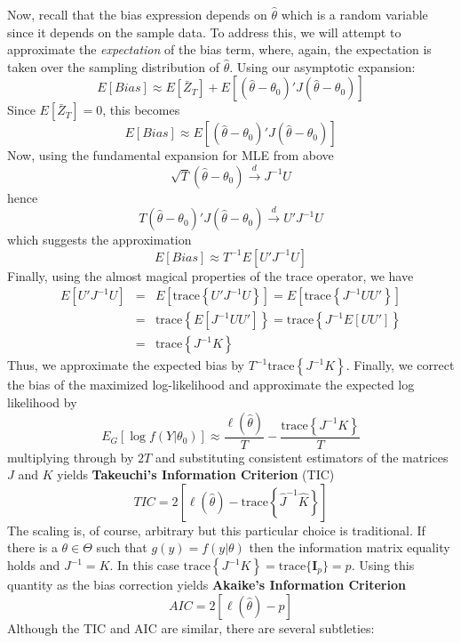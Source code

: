 Now, recall that the bias expression depends on $\widehat{\theta}$ which is a random variable since it depends on the sample data. To address this, we will attempt to approximate the \emph{expectation} of the bias term, where, again, the expectation is taken over the sampling distribution of $\widehat{\theta}$. Using our asymptotic expansion:
$$E[Bias] \approx E[\bar{Z}_T] + E[(\widehat{\theta} - \theta_0)' J (\widehat{\theta} - \theta_0)]$$
Since $E[\bar{Z}_T] = 0$, this becomes
$$E[Bias] \approx E[(\widehat{\theta} - \theta_0)' J (\widehat{\theta} - \theta_0)]$$
Now, using the fundamental expansion for MLE from above
$$\sqrt{T}\left(\widehat{\theta} - \theta_0 \right) \overset{d}{\rightarrow} J^{-1}U$$
hence
$$T\left(\widehat{\theta} - \theta_0 \right)'J\left(\widehat{\theta} - \theta_0 \right) \overset{d}{\rightarrow} U' J^{-1} U$$
which suggests the approximation
$$E[Bias] \approx T^{-1} E[U'J^{-1}U]$$
Finally, using the almost magical properties of the trace operator, we have
\begin{eqnarray*}
E[U'J^{-1}U] &=& E\left[\mbox{trace} \left\{ U'J^{-1}U\right\} \right] = E\left[\mbox{trace} \left\{ J^{-1}UU'\right\} \right]\\
&=& \mbox{trace}\left\{ E[J^{-1}UU']\right\} = \mbox{trace}\left\{J^{-1} E[UU']\right\} \\
&=&\mbox{trace}\left\{ J^{-1} K\right\}
\end{eqnarray*}
Thus, we approximate the expected bias by $T^{-1}\mbox{trace}\left\{ J^{-1} K\right\}$. Finally, we correct the bias of the maximized log-likelihood and approximate the expected log likelihood by
$$E_G[\log f(Y|\theta_0)]\approx \frac{\ell(\widehat{\theta})}{T} - \frac{\mbox{trace}\left\{ J^{-1} K\right\}}{T}$$
multiplying through by $2T$ and substituting consistent estimators of the matrices $J$ and $K$ yields \textbf{Takeuchi's Information Criterion} (TIC)
$$TIC = 2\left[\ell(\widehat{\theta}) - \mbox{trace}\left\{ \widehat{J}^{-1} \widehat{K}\right\} \right]$$
The scaling is, of course, arbitrary but this particular choice is traditional. If there is a $\theta \in \Theta$ such that $g(y) = f(y|\theta)$ then the information matrix equality holds and $J^{-1} = K$. In this case $\mbox{trace}\left\{ J^{-1} K\right\} = \mbox{trace}\{\mathbf{I}_p\} = p$. Using this quantity as the bias correction yields \textbf{Akaike's Information Criterion}
$$AIC = 2 \left[\ell(\widehat{\theta}) - p \right]$$
Although the TIC and AIC are similar, there are several subtleties:
